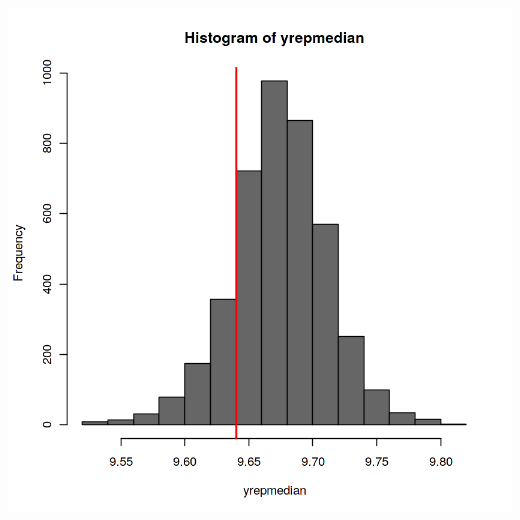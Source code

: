 \documentclass[12pt,a4paper]{article}
\begin{document}
\begin{enumerate}[(a)]
\includegraphics[scale=0.17]{./images/1_Figure6_predictive_2.png}



\end{enumerate}
\end{document}
